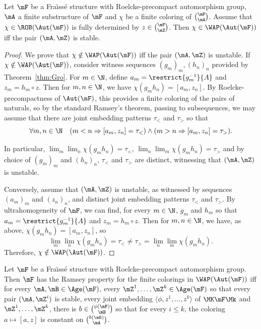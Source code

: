\begin{prop}\label{prop:WAPStable}
Let $\mF$ be a Fra\"{\i}ss\'e structure with Roelcke-precompact automorphism group, $\mA$ a finite substructure of $\mF$ and $\chi$ be a finite coloring of $\binom{\mF}{\mA}$. Assume that $\chi\in \ROB(\Aut(\mF))$ is fully determined by $z\in \binom{\mF}{\mZ}$. Then $\chi\in \WAP(\Aut(\mF))$ iff the pair $(\mA, \mZ)$ is stable.
\end{prop}

\begin{proof}
We prove that $\chi\notin \WAP(\Aut(\mF))$ iff the pair $(\mA, \mZ)$ is unstable. If $\chi\notin \WAP(\Aut(\mF))$, consider witness sequences $(g_{m})_{m}, (h_{n})_{n}$ provided by Theorem~\ref{thm:Gro}. For $m\in \N$, define $a_{m}=\restrict{g_{m}^{-1}}{A}$ and $z_{m}=h_{m}\circ z$. Then for $m,n\in \N$, we have $\chi(g_{m}h_{n})=[a_{m},z_{n}]$. By Roelcke-precompactness of $\Aut(\mF)$, this provides a finite coloring of the pairs of naturals, so by the standard Ramsey's theorem, passing to subsequences, we may assume that there are joint embedding patterns $\tau_{<}$ and $\tau_{>}$ so that
\[
\forall m,n\in \N \quad (m<n \Rightarrow [a_{m},z_{n}]=\tau_{<})\wedge (m>n \Rightarrow [a_{m},z_{n}]=\tau_{>}).
\]

In particular, $\lim_{m}\lim_{n}\chi(g_{m}h_{n})=\tau_{<}$, $\lim_{n}\lim_{m}\chi(g_{m}h_{n})=\tau_{>}$ and by choice of $(g_{m})_{m}$ and $(h_{n})_{n}$, $\tau_{<}$ and $\tau_{>}$ are distinct, witnessing that $(\mA, \mZ)$ is unstable.

Conversely, assume that $(\mA, \mZ)$ is unstable, as witnessed by sequences $(a_{m})_{m}$ and $(z_{n})_{n}$, and distinct joint embedding patterns $\tau_{<}$ and $\tau_{>}$. By ultrahomogeneity of $\mF$, we can find, for every $m\in \N$, $g_{m}$ and $h_{m}$ so that $a_{m}=\restrict{g_{m}^{-1}}{A}$ and $z_{m}=h_{m}\circ z$. Then for $m,n\in \N$, we have, as above, $\chi(g_{m}h_{n})=[a_{m},z_{n}]$, so
\[
\lim_{m}\lim_{n}\chi(g_{m}h_{n})=\tau_{<}\neq \tau_{>} = \lim_{n}\lim_{m}\chi(g_{m}h_{n}).
\]
Therefore, $\chi\notin \WAP(\Aut(\mF))$.
\end{proof}

\begin{prop}
Let $\mF$ be a Fra\"{\i}ss\'e structure with Roelcke-precompact automorphism group. Then $\mF$ has the Ramsey property for the finite colorings in $\WAP(\Aut(\mF))$ iff for every $\mA, \mB \in \Age(\mF)$, every $\mZ^{1},\ldots,\mZ^{k}\in \Age(\mF)$ so that every pair $(\mA, \mZ^{i})$ is stable, every joint embedding $\langle \phi,z^{1},\ldots,z^{k}\rangle$ of $\MK\mF\Mk$ and $\mZ^{1},\ldots,\mZ^{k}$, there is $b\in \binom{\phi(\mF)}{\mB}$ so that for every $i\leq k$, the coloring $a\mapsto [a,z]$ is constant on $\binom{b(\mB)}{\mA}$.
\end{prop}

